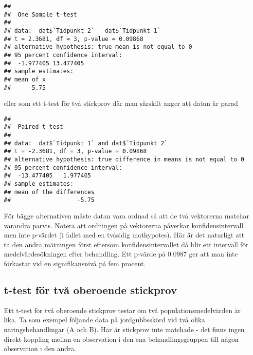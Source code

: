 \documentclass[
]{book}
\newenvironment{Shaded}{\begin{snugshade}}{\end{snugshade}}
\newcommand{\AttributeTok}[1]{\textcolor[rgb]{0.77,0.63,0.00}{#1}}
\newcommand{\FunctionTok}[1]{\textcolor[rgb]{0.00,0.00,0.00}{#1}}
\newcommand{\NormalTok}[1]{#1}
\newcommand{\SpecialCharTok}[1]{\textcolor[rgb]{0.00,0.00,0.00}{#1}}
\newcommand{\StringTok}[1]{\textcolor[rgb]{0.31,0.60,0.02}{#1}}
\theoremstyle{definition}
\theoremstyle{definition}
\theoremstyle{definition}
\theoremstyle{definition}
\theoremstyle{remark}
\begin{document}
\begin{verbatim}
## 
##  One Sample t-test
## 
## data:  dat$`Tidpunkt 2` - dat$`Tidpunkt 1`
## t = 2.3681, df = 3, p-value = 0.09868
## alternative hypothesis: true mean is not equal to 0
## 95 percent confidence interval:
##  -1.977405 13.477405
## sample estimates:
## mean of x 
##      5.75
\end{verbatim}

eller som ett t-test för två stickprov där man särskilt anger att datan är parad

\begin{Shaded}
\end{Shaded}

\begin{verbatim}
## 
##  Paired t-test
## 
## data:  dat$`Tidpunkt 1` and dat$`Tidpunkt 2`
## t = -2.3681, df = 3, p-value = 0.09868
## alternative hypothesis: true difference in means is not equal to 0
## 95 percent confidence interval:
##  -13.477405   1.977405
## sample estimates:
## mean of the differences 
##                   -5.75
\end{verbatim}

För bägge alternativen måste datan vara ordnad så att de två vektorerna matchar varandra parvis. Notera att ordningen på vektorerna påverkar konfidensintervall men inte p-värdet (i fallet med en tvåsidig mothypotes). Här är det naturligt att ta den andra mätningen först eftersom konfidensintervallet då blir ett intervall för medelvärdesökningen efter behandling. Ett p-värde på \(0.0987\) ger att man inte förkastar vid en signifikansnivå på fem procent.

\hypertarget{t-test-fuxf6r-tvuxe5-oberoende-stickprov}{%
\subsection{t-test för två oberoende stickprov}\label{t-test-fuxf6r-tvuxe5-oberoende-stickprov}}

Ett t-test för två oberoende stickprov testar om två populationsmedelvärden är lika. Ta som exempel följande data på jordgubbsskörd vid två olika näringsbehandlingar (A och B). Här är stickprov inte matchade - det finns ingen direkt koppling mellan en observation i den ena behandlingsgruppen till någon observation i den andra.
\end{document}
